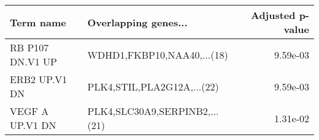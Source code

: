 \begin{tabular}{llr}
\toprule
       Term name &          Overlapping genes... &  Adjusted p-value \\
\midrule
RB P107 DN.V1 UP &    WDHD1,FKBP10,NAA40,...(18) &          9.59e-03 \\
   ERB2 UP.V1 DN &    PLK4,STIL,PLA2G12A,...(22) &          9.59e-03 \\
 VEGF A UP.V1 DN & PLK4,SLC30A9,SERPINB2,...(21) &          1.31e-02 \\
\bottomrule
\end{tabular}
